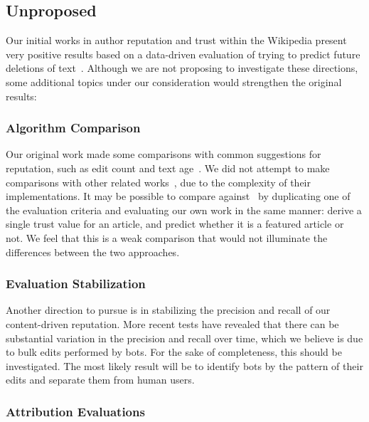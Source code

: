 \subsection{Unproposed}

Our initial works in author reputation and trust within
the Wikipedia present very positive results
based on a data-driven evaluation of trying
to predict future deletions of text~\cite{www07,WikiTrust2008}.
Although we are not proposing to investigate these directions,
some additional topics under our consideration would strengthen
the original results:

\subsubsection{Algorithm Comparison}

Our original work made some comparisons with
common suggestions for reputation, such as edit count
and text age~\cite{www07}.
We did not attempt to make comparisons with other
related works~\cite{McGuinness06,WikiMTWtrust06},
due to the complexity of their implementations.
It may be possible to compare against~\cite{WikiMTWtrust06}
by duplicating one of the evaluation criteria
and evaluating our own work in the same manner:
derive a single trust value for an article,
and predict whether it is a featured article or not.
We feel that this is a weak comparison that would
not illuminate the differences between the two approaches.

\subsubsection{Evaluation Stabilization}

Another direction to pursue is in stabilizing
the precision and recall of our content-driven reputation.
More recent tests have revealed that there can
be substantial variation in the precision and recall over time,
which we believe is due to bulk edits performed by bots.
For the sake of completeness, this should be investigated.
The most likely result will be to identify bots by the
pattern of their edits and separate them from human users.

\subsubsection{Attribution Evaluations}

